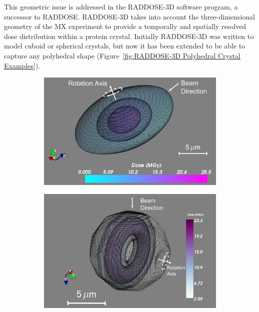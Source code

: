         This geometric issue is addressed in the RADDOSE-3D \cite{zeldin2013} software program, a successor to RADDOSE.
        RADDOSE-3D takes into account the three-dimensional geometry of the MX experiment to provide a temporally and spatially resolved dose distribution within a protein crystal.
        Initially RADDOSE-3D was written to model cuboid or spherical crystals, but now it has been extended to be able to capture any polyhedral shape (Figure~\ref{fig:RADDOSE-3D Polyhedral Crystal Examples}).

        \begin{figure}
            \centering
            \begin{subfigure}[b]{0.463\textwidth}
                    \centering
                    \includegraphics[width=\textwidth]{figures/introduction/ellipsoidcrystal.pdf}
                    \caption{}
                    \label{fig:Ellipsoidal crystal}
            \end{subfigure}
            \quad
            \begin{subfigure}[b]{0.437\textwidth}
                    \centering
                    \includegraphics[width=\textwidth]{figures/introduction/IcoCrystalEdges.pdf}

\end{subfigure}
\end{figure}
